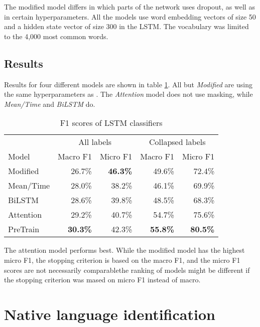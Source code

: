 The modified model differs in which parts of the network uses dropout, as
well as in certain hyperparameters. All the models use word embedding vectors
of size 50 and a hidden state vector of size 300 in the \ac{LSTM}. The
vocabulary was limited to the 4,000 most common words.

\subsection{Results}

Results for four different models are shown in table \ref{lstm-results}. All
but \emph{Modified} are using the same hyperparameters as
\citeauthor{taghipour16}. The \emph{Attention} model does not use masking,
while \emph{Mean/Time} and \emph{BiLSTM} do.

\begin{table}
  \centering
  \begin{tabular}{|l|rr|rr|}
    \toprule
            & \multicolumn{2}{c|}{All labels} & \multicolumn{2}{c|}{Collapsed labels} \\
    Model     & Macro F1        & Micro F1        & Macro F1        & Micro F1        \\
    \midrule
    Modified  &         26.7\%  & \textbf{46.3\%} &         49.6\%  &         72.4\%  \\
    Mean/Time &         28.0\%  &         38.2\%  &         46.1\%  &         69.9\%  \\
    BiLSTM    &         28.6\%  &         39.8\%  &         48.5\%  &         68.3\%  \\
    Attention &         29.2\%  &         40.7\%  &         54.7\%  &         75.6\%  \\
    PreTrain  & \textbf{30.3\%} &         42.3\%  & \textbf{55.8\%} & \textbf{80.5\%} \\
    \bottomrule
  \end{tabular}
  \caption{F1 scores of LSTM classifiers}
  \label{lstm-results}
\end{table}

The attention model performs best. While the modified model has the highest
micro F1, the stopping criterion is based on the macro F1, and the micro
F1 scores are not necessarily comparable\textemdash the ranking of models might be
different if the stopping criterion was mased on micro F1 instead of macro.


\section{Native language identification}

